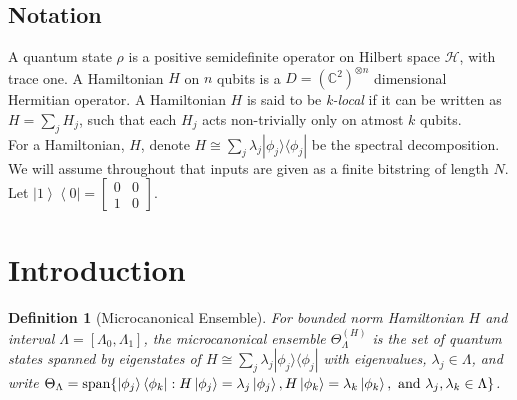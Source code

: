\documentclass[10pt]{amsart}
\newtheorem{definition}{Definition}
\newcommand{\dmat}[1]{{| #1 \rangle \langle #1 |}}
\newcommand{\dm}[2]{\left|#1\right\rangle\left\langle#2\right|}
\begin{document}
\subsection*{Notation}
A quantum state $\rho$ is a positive semidefinite operator on Hilbert space $\mathcal{H}$, with trace one. 
A Hamiltonian $H$ on $n$ qubits is a $D=(\mathbb{C}^2)^{\otimes n}$ dimensional Hermitian operator. A Hamiltonian $H$ is said to be \textit{k-local} if it can be written as $H=\sum_{j} H_j$, such that each $H_j$ acts non-trivially only on atmost $k$ qubits.\\
For a Hamiltonian, $H$, denote $H \cong \sum_{j} \lambda_j \dmat{\phi_j}$ be the spectral decomposition. %
We will assume throughout that inputs are given as a finite bitstring of length $N$. %
Let $\dm{1}{0} = \begin{bmatrix}
    0 & 0  \\ 1 & 0
\end{bmatrix}$. 

\section{Introduction}


\begin{definition}[Microcanonical Ensemble] 
For bounded norm Hamiltonian $H$ and interval $\Lambda=[\Lambda_0,\Lambda_1]$, the microcanonical ensemble $\Theta^{(H)}_{\Lambda}$ is the set of quantum states spanned by eigenstates of $H \cong \sum_j\lambda_j \dmat{\phi_j} $ with eigenvalues, $\lambda_j \in \Lambda$, and write $\Theta_{\Lambda}= \text{span}\{ \dm{\phi_j}{\phi_k} : H \ket{\phi_j} = \lambda_j \ket{\phi_j}, H \ket{\phi_k} = \lambda_k \ket{\phi_k}, \text{ and } \lambda_j,\lambda_k \in \Lambda \}$. \\ 
\end{definition}
\end{document}

